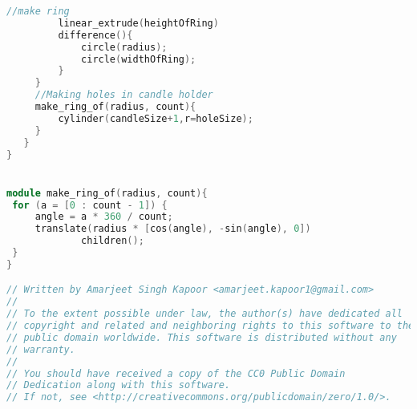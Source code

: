\begin{lstlisting}[language=c++]
         //make ring
         linear_extrude(heightOfRing)
         difference(){    
             circle(radius);
             circle(widthOfRing);
         }
     }
     //Making holes in candle holder
     make_ring_of(radius, count){
         cylinder(candleSize+1,r=holeSize);
     }
   }
}


module make_ring_of(radius, count){
 for (a = [0 : count - 1]) {
     angle = a * 360 / count;
     translate(radius * [cos(angle), -sin(angle), 0])
             children();
 }
}

// Written by Amarjeet Singh Kapoor <amarjeet.kapoor1@gmail.com>
//
// To the extent possible under law, the author(s) have dedicated all
// copyright and related and neighboring rights to this software to the
// public domain worldwide. This software is distributed without any
// warranty.
//
// You should have received a copy of the CC0 Public Domain
// Dedication along with this software.
// If not, see <http://creativecommons.org/publicdomain/zero/1.0/>.
\end{lstlisting}

